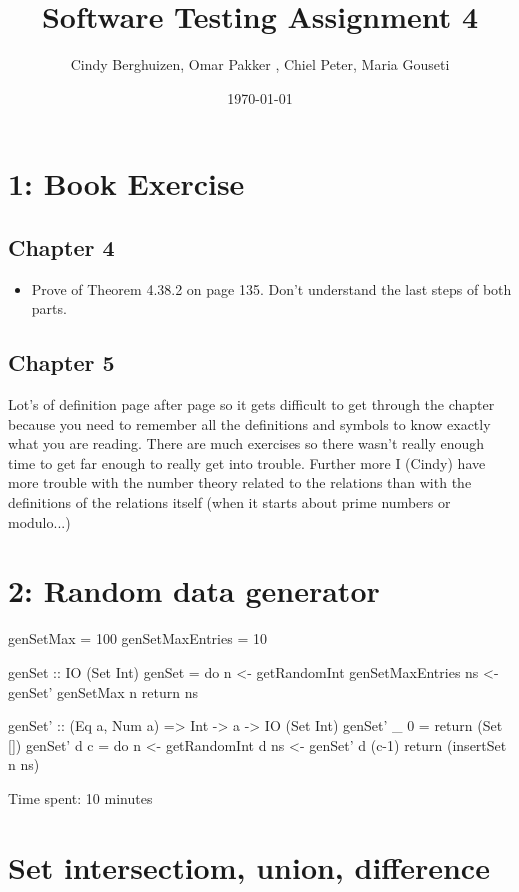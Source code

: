 \documentclass{article}
\begin{document}
\setlength{\parindent}{0cm}
\title{Software Testing Assignment 4}
\author{Cindy Berghuizen, Omar Pakker , Chiel Peter, Maria Gouseti}
\date{\today}
\maketitle
\section*{1: Book Exercise}

\subsection*{Chapter 4}
\begin{itemize}
\item Prove of Theorem 4.38.2 on page 135.  Don't understand the last steps of both parts.
\end{itemize}
\subsection*{Chapter 5}
Lot's of definition page after page so it gets difficult to get through the chapter because you need to remember all the definitions and symbols to know exactly what you are reading. There are much exercises so there wasn't really enough time to get far enough to really get into trouble. Further more I (Cindy) have more trouble with the number theory related to the relations than with the definitions of the relations itself (when it starts about prime numbers or modulo...)
\section*{2: Random data generator}

\begin{code}
genSetMax = 100
genSetMaxEntries = 10

genSet :: IO (Set Int)
genSet =  do
   n  <- getRandomInt genSetMaxEntries
   ns <- genSet' genSetMax n
   return ns

genSet' :: (Eq a, Num a) => Int -> a -> IO (Set Int)
genSet' _ 0 = return (Set [])
genSet' d c = do
         n <- getRandomInt d
         ns <- genSet' d (c-1)
         return (insertSet n ns)

\end{code}
Time spent: 10 minutes

\section*{Set intersectiom, union, difference}
\end{document}
